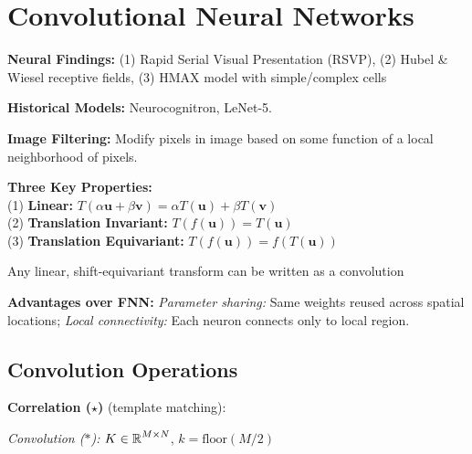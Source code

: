 \section{Convolutional Neural Networks}

\textbf{Neural Findings:} (1) Rapid Serial Visual Presentation (RSVP), (2) Hubel \& Wiesel receptive fields, (3) HMAX model with simple/complex cells

\textbf{Historical Models:} Neurocognitron, LeNet-5.

\textbf{Image Filtering:} Modify pixels in image based on some function of a local neighborhood of pixels.

\textbf{Three Key Properties:}\\
(1) \textbf{Linear:} $T(\alpha \mathbf{u} + \beta \mathbf{v}) = \alpha T(\mathbf{u}) + \beta T(\mathbf{v})$\\
(2) \textbf{Translation Invariant:} $T(f(\mathbf{u})) = T(\mathbf{u})$ \\
(3) \textbf{Translation Equivariant:} $T(f(\mathbf{u})) = f(T(\mathbf{u}))$

\begin{highlightbox*}[gray!30]
Any linear, shift-equivariant transform can be written as a convolution
\end{highlightbox*}

\textbf{Advantages over FNN:} \textit{Parameter sharing:} Same weights reused across spatial locations; \textit{Local connectivity:} Each neuron connects only to local region.

\subsection{Convolution Operations}

\textbf{Correlation ($\star$)} (template matching):

\emph{Convolution ($*$):} $K \in \operatorname{\mathbb{R}}^{M \times N}$, $k=\text{floor}(M/2)$
{\small
{}
}


